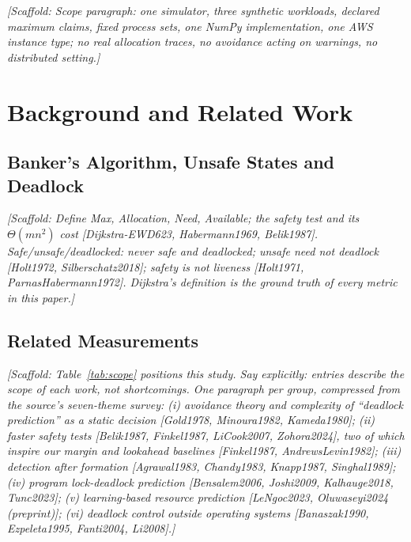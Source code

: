 \documentclass[conference]{IEEEtran}
\newcommand{\scaffold}[1]{\textcolor{blue!60!black}{\textit{[Scaffold: #1]}}}
\begin{document}
\scaffold{Scope paragraph: one simulator, three synthetic workloads, declared maximum claims, fixed process sets, one NumPy implementation, one AWS instance type; no real allocation traces, no avoidance acting on warnings, no distributed setting.}

\section{Background and Related Work}\label{sec:related}

\subsection{Banker's Algorithm, Unsafe States and Deadlock}\label{sec:bg-banker}
\scaffold{Define Max, Allocation, Need, Available; the safety test and its $\Theta(mn^2)$ cost [Dijkstra-EWD623, Habermann1969, Belik1987]. Safe/unsafe/deadlocked: never safe and deadlocked; unsafe need not deadlock [Holt1972, Silberschatz2018]; safety is not liveness [Holt1971, ParnasHabermann1972]. Dijkstra's definition is the ground truth of every metric in this paper.}

\subsection{Related Measurements}\label{sec:bg-related}
\scaffold{Table~\ref{tab:scope} positions this study. Say explicitly: entries describe the scope of each work, not shortcomings. One paragraph per group, compressed from the source's seven-theme survey: (i) avoidance theory and complexity of ``deadlock prediction'' as a static decision [Gold1978, Minoura1982, Kameda1980]; (ii) faster safety tests [Belik1987, Finkel1987, LiCook2007, Zohora2024], two of which inspire our margin and lookahead baselines [Finkel1987, AndrewsLevin1982]; (iii) detection after formation [Agrawal1983, Chandy1983, Knapp1987, Singhal1989]; (iv) program lock-deadlock prediction [Bensalem2006, Joshi2009, Kalhauge2018, Tunc2023]; (v) learning-based resource prediction [LeNgoc2023, Oluwaseyi2024 (preprint)]; (vi) deadlock control outside operating systems [Banaszak1990, Ezpeleta1995, Fanti2004, Li2008].}
\end{document}
